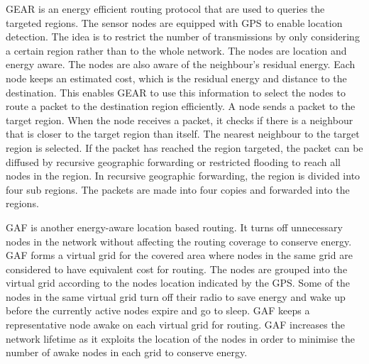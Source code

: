 GEAR is an energy efficient routing protocol that are used to queries the targeted regions. The sensor nodes are equipped with GPS to enable location detection. The idea is to restrict the number of transmissions by only considering a certain region rather than to the whole network. The nodes are location and energy aware. The nodes are also aware of the neighbour's residual energy. Each node keeps an estimated cost, which is the residual energy and distance to the destination. This enables GEAR to use this information to select the nodes to route a packet to the destination region efficiently. A node sends a packet to the target region. When the node receives a packet, it checks if there is a neighbour that is closer to the target region than itself. The nearest neighbour to the target region is selected. If the packet has reached the region targeted, the packet can be diffused by recursive geographic forwarding or restricted flooding to reach all nodes in the region. In recursive geographic forwarding, the region is divided into four sub regions. The packets are made into four copies and forwarded into the regions.


GAF is another energy-aware location based routing. It turns off unnecessary nodes in the network without affecting the routing coverage to conserve energy. GAF forms a virtual grid for the covered area where nodes in the same grid are considered to have equivalent cost for routing. The nodes are grouped into the virtual grid according to the nodes location indicated by the GPS. Some of the nodes in the same virtual grid turn off their radio to save energy and wake up before the currently active nodes expire and go to sleep. GAF keeps a representative node awake on each virtual grid for routing. GAF increases the network lifetime as it exploits the location of the nodes in order to minimise the number of awake nodes in each grid to conserve energy. 

